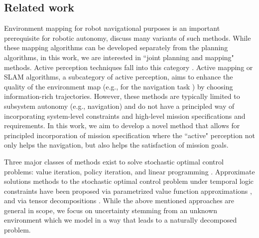 \documentclass[conference]{IEEEtran}
\renewcommand{\cite}[1]{\citep{#1}}
\begin{document}
\subsection{Related work}
Environment mapping for robot navigational purposes is an important prerequisite for robotic autonomy, \cite{Thrun2005,stachniss2009_book,thrun2002robotic} discuss many variants of such methods. While these mapping algorithms can be developed separately from the planning algorithms, in this work, we are interested in ``joint planning and mapping" methods. Active perception techniques fall into this category \cite{blake1992active, aloimonos1988active,soatto2013actionable}. Active mapping or SLAM algorithms, a subcategory of active perception, aims to enhance the quality of the environment map (e.g., for the navigation task \cite{Agha2017_ISRR,feder1999adaptive,davison2002simultaneous,Mu16-CDC}) by choosing information-rich trajectories. However, these methods are typically limited to subsystem autonomy (e.g., navigation) and do not have a principled way of incorporating system-level constraints and high-level mission specifications and requirements. In this work, we aim to develop a novel method that allows for principled incorporation of mission specification where the ``active" perception not only helps the navigation, but also helps the satisfaction of mission goals.

Three major classes of methods exist to solve stochastic optimal control problems: value iteration, policy iteration, and linear programming \cite{Bertsekas1978}. Approximate solutions methods to the stochastic optimal control problem under temporal logic constraints have been proposed via parametrized value function approximations \cite{Papusha2016,Leong2016}, and via tensor decompositions \cite{Alora2016}. While the above mentioned approaches are general in scope, we focus on uncertainty stemming from an unknown environment which we model in a way that leads to a naturally decomposed problem.

\end{document}
